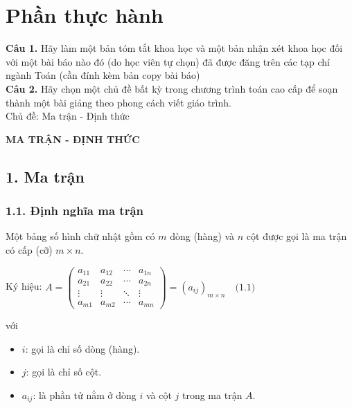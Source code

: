 \section {Phần thực hành}
{\bf Câu 1.} Hãy làm một bản tóm tắt khoa học và một bản nhận xét khoa
học đối với một bài báo nào đó (do học viên tự chọn) đã được đăng trên các
tạp chí ngành Toán (cần đính kèm bản copy bài báo)\\
{\bf Câu 2. } Hãy chọn một chủ đề bất kỳ trong chương trình toán cao cấp
để soạn thành một bài giảng theo phong cách viết giáo trình.\\
Chủ đề: Ma trận - Định thức\\
\newpage
\begin{center}
    \huge {\bf MA TRẬN - ĐỊNH THỨC}
\end{center}

\subsection*{1. Ma trận}
\subsubsection*{1.1. Định nghĩa ma trận}
Một bảng số hình chữ nhật gồm có $m$ dòng (hàng) và $n$ cột được gọi là ma trận có cấp (cỡ) $m \times n$.

\begin{center}
Ký hiệu: $A = \begin{pmatrix}
a_{11} & a_{12} & \cdots & a_{1n} \\
a_{21} & a_{22} & \cdots & a_{2n} \\
\vdots & \vdots & \ddots & \vdots \\
a_{m1} & a_{m2} & \cdots & a_{mn}
\end{pmatrix} = \left( a_{ij} \right)_{m \times n} \quad \text{(1.1)}$

\end{center}

\vspace{10pt}
với
\begin{itemize}
    \item $i$: gọi là chỉ số dòng (hàng).
    \item $j$: gọi là chỉ số cột.
    \item $a_{ij}$: là phần tử nằm ở dòng $i$ và cột $j$ trong ma trận $A$.
\end{itemize}


